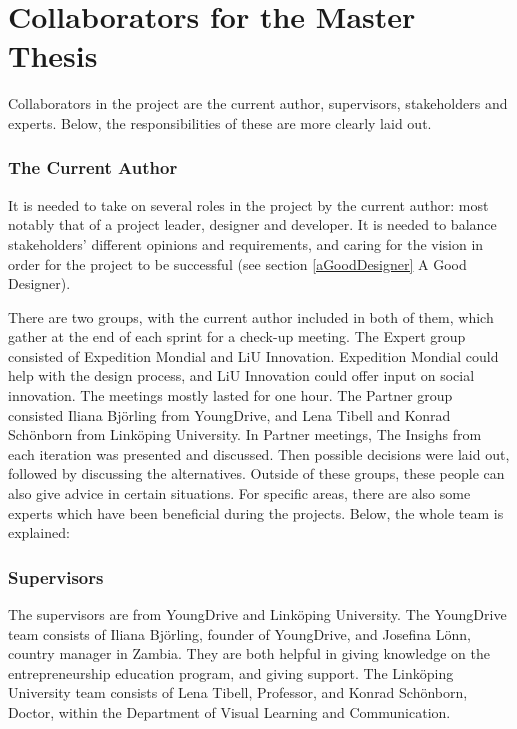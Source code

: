 \section{Collaborators for the Master Thesis}\label{sec:collaborators}

Collaborators in the project are the current author, supervisors, stakeholders and experts. Below, the responsibilities of these are more clearly laid out.

\subsubsection{The Current Author}
It is needed to take on several roles in the project by the current author: most notably that of a project leader, designer and developer. It is needed to balance stakeholders' different opinions and requirements, and caring for the vision in order for the project to be successful (see section \ref{aGoodDesigner} A Good Designer).

There are two groups, with the current author included in both of them, which gather at the end of each sprint for a check-up meeting. The Expert group consisted of Expedition Mondial and LiU Innovation. Expedition Mondial could help with the design process, and LiU Innovation could offer input on social innovation. The meetings mostly lasted for one hour. The Partner group consisted Iliana Björling from YoungDrive, and Lena Tibell and Konrad Schönborn from Linköping University. In Partner meetings, The Insighs from each iteration was presented and discussed. Then possible decisions were laid out, followed by discussing the alternatives. Outside of these groups, these people can also give advice in certain situations. For specific areas, there are also some experts which have been beneficial during the projects. Below, the whole team is explained: %

\subsubsection{Supervisors}
The supervisors are from YoungDrive and Linköping University. The YoungDrive team consists of Iliana Björling, founder of YoungDrive, and Josefina Lönn, country manager in Zambia. They are both helpful in giving knowledge on the entrepreneurship education program, and giving support. The Linköping University team consists of Lena Tibell, Professor, and Konrad Schönborn, Doctor, within the Department of Visual Learning and Communication.

